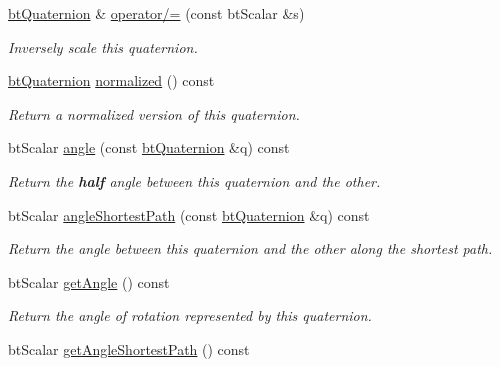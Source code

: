 \begin{DoxyCompactItemize}
\hyperlink{classbtQuaternion}{bt\+Quaternion} \& \hyperlink{classbtQuaternion_a294fe99e7e5a8e0d45d111334e2e1552}{operator/=} (const bt\+Scalar \&s)
\begin{DoxyCompactList}\small\item\em Inversely scale this quaternion. \end{DoxyCompactList}\item 
\mbox{\label{classbtQuaternion_aa23ea377b98256ad7f2236a2a3a33a6e}} 
\hyperlink{classbtQuaternion}{bt\+Quaternion} \hyperlink{classbtQuaternion_aa23ea377b98256ad7f2236a2a3a33a6e}{normalized} () const
\begin{DoxyCompactList}\small\item\em Return a normalized version of this quaternion. \end{DoxyCompactList}\item 
bt\+Scalar \hyperlink{classbtQuaternion_a78254a50772f21074f09388a17d8b02b}{angle} (const \hyperlink{classbtQuaternion}{bt\+Quaternion} \&q) const
\begin{DoxyCompactList}\small\item\em Return the {\itshape {\bfseries half}} angle between this quaternion and the other. \end{DoxyCompactList}\item 
bt\+Scalar \hyperlink{classbtQuaternion_a1a518843a038c9078deb0f83782ed8aa}{angle\+Shortest\+Path} (const \hyperlink{classbtQuaternion}{bt\+Quaternion} \&q) const
\begin{DoxyCompactList}\small\item\em Return the angle between this quaternion and the other along the shortest path. \end{DoxyCompactList}\item 
\mbox{\label{classbtQuaternion_a65235507c6319f3ea16c884231dff668}} 
bt\+Scalar \hyperlink{classbtQuaternion_a65235507c6319f3ea16c884231dff668}{get\+Angle} () const
\begin{DoxyCompactList}\small\item\em Return the angle of rotation represented by this quaternion. \end{DoxyCompactList}\item 
\mbox{\label{classbtQuaternion_abe995d64f60c0cd51278da798518933d}} 
bt\+Scalar \hyperlink{classbtQuaternion_abe995d64f60c0cd51278da798518933d}{get\+Angle\+Shortest\+Path} () const

\end{DoxyCompactItemize}
